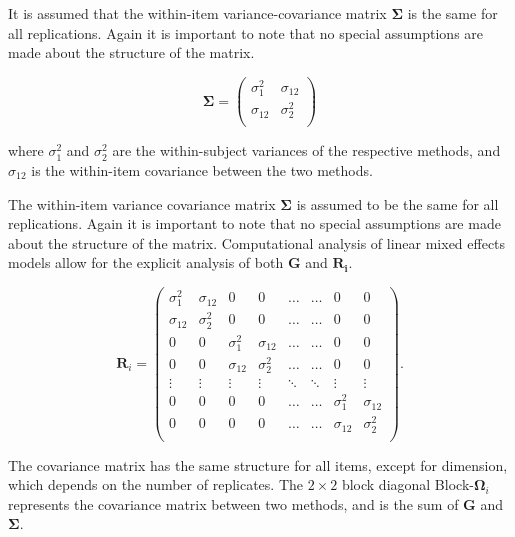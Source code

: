 \documentclass[12pt, a4paper]{report}
\theoremstyle{plain}
\theoremstyle{definition}
\theoremstyle{remark}
\begin{document}
It is assumed that the within-item variance-covariance matrix $\boldsymbol{\Sigma}$ is the same for all replications. Again it is important to note that no special assumptions are made about the structure of the matrix.

\begin{equation}
\boldsymbol{\Sigma} = \left( \begin{array}{cc}
\sigma^2_{1} & \sigma_{12} \\
\sigma_{12} & \sigma^2_{2} \\
\end{array}\right)
\end{equation}

where $\sigma^2_{1}$ and $\sigma^2_{2}$ are the within-subject variances of the respective methods, and $\sigma_{12}$ is the within-item covariance between the two methods. 

The within-item variance covariance matrix $\boldsymbol{\Sigma}$ is assumed to be the same for all replications.  Again it is important to note that no special assumptions are made about the structure of the matrix. Computational analysis of linear mixed effects models allow for the explicit analysis of both $\boldsymbol{G}$ and $\boldsymbol{R_i}$.

\[ \boldsymbol{R}_i =\left(
\begin{array}{cccccccc}
\sigma^2_1  & \sigma_{12} & 0 & 0 & \ldots & \ldots & 0 & 0 \\
\sigma_{12} & \sigma^2_2  & 0 & 0  & \ldots & \ldots & 0 & 0\\

0 & 0 &\sigma^2_1  & \sigma_{12} & \ldots & \ldots& 0 &  0 \\
0 & 0 &\sigma_{12} & \sigma^2_2  & \ldots & \ldots & 0 & 0 \\
\vdots & \vdots &\vdots & \vdots & \ddots & \ddots& \vdots & \vdots \\

0 & 0 &0 & 0 & \ldots & \ldots&\sigma^2_1  & \sigma_{12} \\
0 & 0 &0 & 0 & \ldots & \ldots &\sigma_{12} & \sigma^2_2 \\
\end{array}
\right). \]

The covariance matrix has the same structure for all items, except for dimension, which depends on the number of replicates. The $2 \times 2$ block diagonal Block-$\boldsymbol{\Omega}_{i}$ represents the covariance matrix between two methods, and is the sum of $\boldsymbol{G}$ and $\boldsymbol{\Sigma}$.
\end{document}
